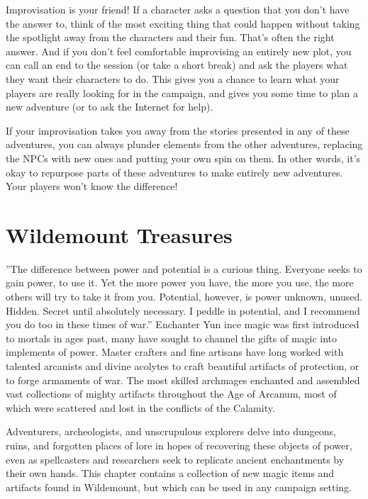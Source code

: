 \documentclass[10pt,a4paper,twoside,bg=print,twocolumn,openany,nodeprecatedcode]{dndbook}
\begin{document}
Improvisation is your friend! If a character asks a question that you don't have the answer to, think of the most exciting thing that could happen without taking the spotlight away from the characters and their fun. That's often the right answer. And if you don't feel comfortable improvising an entirely new plot, you can call an end to the session (or take a short break) and ask the players what they want their characters to do. This gives you a chance to learn what your players are really looking for in the campaign, and gives you some time to plan a new adventure (or to ask the Internet for help).

If your improvisation takes you away from the stories presented in any of these adventures, you can always plunder elements from the other adventures, replacing the NPCs with new ones and putting your own spin on them. In other words, it's okay to repurpose parts of these adventures to make entirely new adventures. Your players won't know the difference!

\chapter{Wildemount Treasures}
\DndQuote%
{}
{''The difference between power and potential is a curious thing. Everyone seeks to gain power, to use it. Yet the more power you have, the more you use, the more others will try to take it from you. Potential, however, is power unknown, unused. Hidden. Secret until absolutely necessary. I peddle in potential, and I recommend you do too in these times of war.''}
{Enchanter Yun}
ince magic was first introduced to mortals in ages past, many have sought to channel the gifts of magic into implements of power. Master crafters and fine artisans have long worked with talented arcanists and divine acolytes to craft beautiful artifacts of protection, or to forge armaments of war. The most skilled archmages enchanted and assembled vast collections of mighty artifacts throughout the Age of Arcanum, most of which were scattered and lost in the conflicts of the Calamity.


Adventurers, archeologists, and unscrupulous explorers delve into dungeons, ruins, and forgotten places of lore in hopes of recovering these objects of power, even as spellcasters and researchers seek to replicate ancient enchantments by their own hands. This chapter contains a collection of new magic items and artifacts found in Wildemount, but which can be used in any campaign setting.
\end{document}
